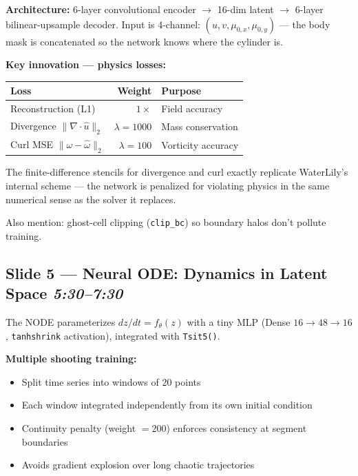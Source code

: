 \documentclass[11pt, a4paper]{article}
\begin{document}
\textbf{Architecture:} 6-layer convolutional encoder $\to$ 16-dim latent $\to$ 6-layer
bilinear-upsample decoder. Input is 4-channel: $(u, v, \mu_{0,x}, \mu_{0,y})$ ---
the body mask is concatenated so the network knows where the cylinder is.

\textbf{Key innovation --- physics losses:}

\begin{center}
\begin{tabular}{lrl}
\toprule
\textbf{Loss} & \textbf{Weight} & \textbf{Purpose} \\
\midrule
Reconstruction (L1) & $1\times$ & Field accuracy \\
Divergence $\|\nabla\cdot\hat{u}\|_2$ & $\lambda = 1000$ & Mass conservation \\
Curl MSE $\|\omega - \hat{\omega}\|_2$ & $\lambda = 100$ & Vorticity accuracy \\
\bottomrule
\end{tabular}
\end{center}

The finite-difference stencils for divergence and curl exactly replicate WaterLily's
internal scheme --- the network is penalized for violating physics in the same
numerical sense as the solver it replaces.

Also mention: ghost-cell clipping (\texttt{clip\_bc}) so boundary halos don't pollute training.

\subsection*{Slide 5 --- Neural ODE: Dynamics in Latent Space \hfill \normalfont\textit{5:30--7:30}}

The NODE parameterizes $dz/dt = f_\theta(z)$ with a tiny MLP
(Dense $16\to48\to16$, \texttt{tanhshrink} activation), integrated with \texttt{Tsit5()}.

\textbf{Multiple shooting training:}
\begin{itemize}
  \item Split time series into windows of 20 points
  \item Each window integrated independently from its own initial condition
  \item Continuity penalty (weight $= 200$) enforces consistency at segment boundaries
  \item Avoids gradient explosion over long chaotic trajectories
\end{itemize}
\end{document}

